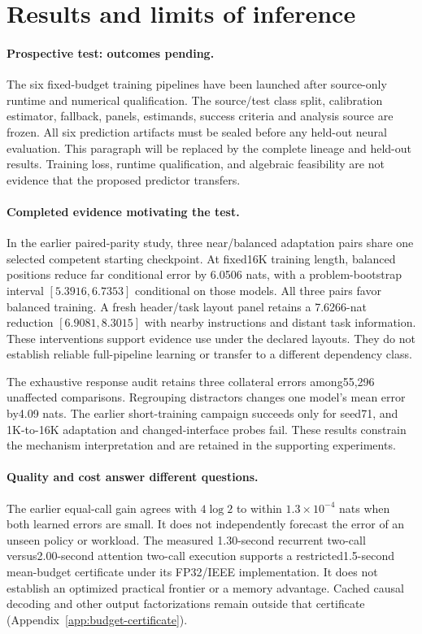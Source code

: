 \section{Results and limits of inference}
\paragraph{Prospective test: outcomes pending.}
The six fixed-budget training pipelines have been launched after source-only
runtime and numerical qualification. The source/test class split, calibration
estimator, fallback, panels, estimands, success criteria and analysis source are
frozen. All six prediction artifacts must be sealed before any held-out neural
evaluation. This paragraph will be replaced by the complete lineage and
held-out results. Training loss, runtime qualification, and algebraic feasibility
are not evidence that the proposed predictor transfers.

\paragraph{Completed evidence motivating the test.}
In the earlier paired-parity study, three near/balanced adaptation pairs share
one selected competent starting checkpoint. At fixed16K training length,
balanced positions reduce far conditional error by 6.0506 nats, with a
problem-bootstrap interval $[5.3916,6.7353]$ conditional on those models.
All three pairs favor balanced training. A fresh header/task layout panel
retains a 7.6266-nat reduction $[6.9081,8.3015]$ with nearby instructions and
distant task information. These interventions support evidence use under the
declared layouts. They do not establish reliable full-pipeline learning or
transfer to a different dependency class.

The exhaustive response audit retains three collateral errors among55,296
unaffected comparisons. Regrouping distractors changes one model's mean error
by4.09 nats. The earlier short-training campaign succeeds only for seed71, and
1K-to-16K adaptation and changed-interface probes fail. These results constrain
the mechanism interpretation and are retained in the supporting experiments.

\paragraph{Quality and cost answer different questions.}
The earlier equal-call gain agrees with $4\log2$ to within
$1.3\times10^{-4}$ nats when both learned errors are small. It does not
independently forecast the error of an unseen policy or workload. The measured
1.30-second recurrent two-call versus2.00-second attention two-call execution
supports a restricted1.5-second mean-budget certificate under its FP32/IEEE
implementation. It does not establish an optimized practical frontier or a
memory advantage. Cached causal decoding and other output factorizations remain
outside that certificate (Appendix~\ref{app:budget-certificate}).

